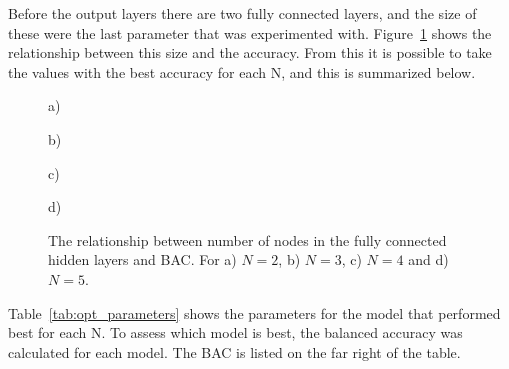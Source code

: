 Before the output layers there are two fully connected layers, and the size of these were the last parameter that was experimented with. Figure~\ref{fig:fc_acc} shows the relationship between this size and the accuracy. From this it is possible to take the values with the best accuracy for each N, and this is summarized below. 

\begin{figure}[H]
    \centering
    \begin{minipage}[b]{0.42\textwidth}
        
        \vspace{-0.5cm}
        \caption*{a)}
    \end{minipage}
    \begin{minipage}[b]{0.42\textwidth}
        
        \vspace{-0.5cm}
        \caption*{b)}
    \end{minipage}
    \begin{minipage}[b]{0.42\textwidth}
        
        \vspace{-0.5cm}
        \caption*{c)}
    \end{minipage}
    \begin{minipage}[b]{0.42\textwidth}
        
        \vspace{-0.5cm}
        \caption*{d)}
    \end{minipage}
    \captionsetup{width=0.95\linewidth}
    \caption{The relationship between number of nodes in the fully connected hidden layers and BAC. For a) $N=2$, b) $N=3$, c) $N=4$ and d) $N=5$.}
    \label{fig:fc_acc}
\end{figure}

Table~\ref{tab:opt_parameters} shows the parameters for the model that performed best for each N. To assess which model is best, the balanced accuracy was calculated for each model. The BAC is listed on the far right of the table.

